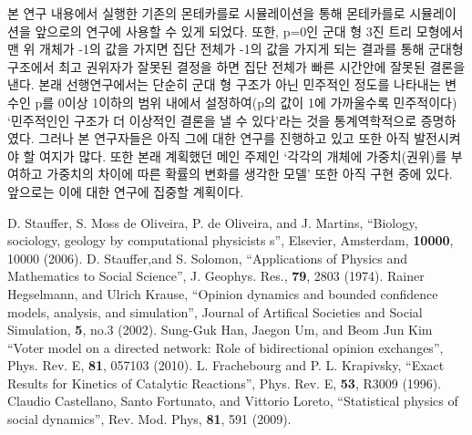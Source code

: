 \documentclass{gshs-report-v1.2}
\begin{document}
본 연구 내용에서 실행한 기존의 몬테카를로 시뮬레이션을 통해 몬테카를로 시뮬레이션을 앞으로의 연구에 사용할 수 있게 되었다. 또한, p=0인 군대 형 3진 트리 모형에서 맨 위 개체가 -1의 값을 가지면 집단 전체가 -1의 값을 가지게 되는 결과를 통해 군대형 구조에서 최고 권위자가 잘못된 결정을 하면 집단 전체가 빠른 시간안에 잘못된 결론을 낸다.
본래 선행연구\cite{Han10}에서는 단순히 군대 형 구조가 아닌 민주적인 정도를 나타내는 변수인 p를 0이상 1이하의 범위 내에서 설정하여(p의 값이 1에 가까울수록 민주적이다) ‘민주적인인 구조가 더 이상적인 결론을 낼 수 있다’라는 것을 통계역학적으로 증명하였다. 그러나 본 연구자들은 아직 그에 대한 연구를 진행하고 있고 또한 아직 발전시켜야 할 여지가 많다. 
또한 본래 계획했던 메인 주제인 ‘각각의 개체에 가중치(권위)를 부여하고 가중치의 차이에 따른 확률의 변화를 생각한 모델’ 또한 아직 구현 중에 있다. 앞으로는 이에 대한 연구에 집중할 계획이다. 


\begin{thebibliography}{99}

 D. Stauffer, S. Moss de Oliveira, P. de Oliveira, and J. Martins, ``Biology, sociology, geology by computational
physicists s'', Elsevier, Amsterdam, {\bf 10000}, 10000 (2006).
 D. Stauffer,and S. Solomon, ``Applications of Physics and Mathematics to Social Science'', J. Geophys. Res., {\bf 79}, 2803 (1974).
 Rainer Hegselmann, and Ulrich Krause, ``Opinion dynamics and bounded confidence models, analysis, and simulation'', Journal of Artifical Societies and Social Simulation, {\bf 5}, no.3 (2002).
 Sung-Guk Han, Jaegon Um, and Beom Jun Kim ``Voter model on a directed network: Role of bidirectional opinion exchanges'', Phys. Rev. E, {\bf 81}, 057103 (2010).
 L. Frachebourg and P. L. Krapivsky, ``Exact Results for Kinetics of Catalytic Reactions'', Phys. Rev. E, {\bf 53}, R3009 (1996).
 Claudio Castellano, Santo Fortunato, and Vittorio Loreto, ``Statistical physics of social dynamics'', Rev. Mod. Phys, {\bf 81}, 591 (2009).

\end{thebibliography}

%
%
%
%
%
\end{document}
